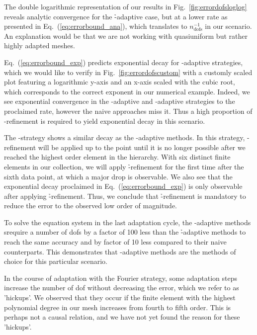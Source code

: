 The double logarithmic representation of our results in Fig.~\ref{fig:errordofsloglog} reveals analytic convergence for the \h-adaptive case, but at a lower rate as presented in Eq.~(\ref{eq:errorbound_ana}), which translates to $n_\text{dofs}^{-1}$ in our scenario. An explanation would be that we are not working with quasiuniform but rather highly adapted meshes.

Eq.~(\ref{eq:errorbound_exp}) predicts exponential decay for \hp-adaptive strategies, which we would like to verify in Fig.~\ref{fig:errordofscustom} with a customly scaled plot featuring a logarithmic y-axis and an x-axis scaled with the cubic root, which corresponds to the correct exponent in our numerical example. Indeed, we see exponential convergence in the \p-adaptive and \hp-adaptive strategies to the proclaimed rate, however the naive approaches miss it. Thus a high proportion of \p-refinement is required to yield exponential decay in this scenario.

The \p-strategy shows a similar decay as the \hp-adaptive methods.%
In this strategy, \p-refinement will be applied up to the point until it is no longer possible after we reached the highest order element in the hierarchy. With six distinct finite elements in our collection, we will apply \h-refinement for the first time after the sixth data point, at which a major drop is observable. We also see that the exponential decay proclaimed in Eq.~(\ref{eq:errorbound_exp}) is only observable after applying \h-refinement. Thus, we conclude that \h-refinement is mandatory to reduce the error to the observed low order of magnitude.

To solve the equation system in the last adaptation cycle, the \hp-adaptive methods %
srequire a number of \glspl{dof} by a factor of 100 less than the \h-adaptive methods to reach the same accuracy
and by factor of 10 less compared to their naive counterparts. This demonstrates that \hp-adaptive methods are the methods of choice for this particular scenario.


In the course of adaptation with the Fourier strategy, some adaptation steps increase the number of \gls{dof} without decreasing the error, which we refer to as 'hickups'.
We observed that they occur if the finite element with the highest polynomial degree in our mesh increases from fourth to fifth order. This is perhaps not a causal relation, and we have not yet found the reason for these 'hickups'.

